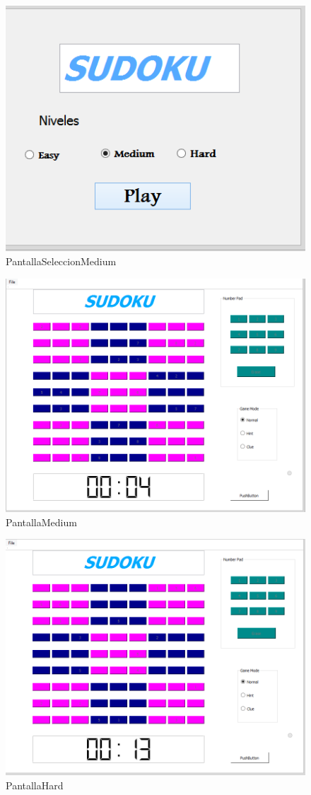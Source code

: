 \documentclass[12pt,oneside]{book}
\begin{document}
\begin{figure}[htbp]
\begin{center}
\includegraphics[width=.60\textwidth]{./imagenes/PantallaSeleccionMedium.png}
\caption{PantallaSeleccionMedium}
\label{PantallaSeleccionMedium}
\end{center}
\end{figure}

\begin{figure}[htbp]
\begin{center}
\includegraphics[width=.60\textwidth]{./imagenes/PantallaMedium.png}
\caption{PantallaMedium}
\label{PantallaMedium}
\end{center}
\end{figure}

\begin{figure}[htbp]
\begin{center}
\includegraphics[width=.60\textwidth]{./imagenes/PantallaHard.png}
\caption{PantallaHard}
\label{PantallaHard}
\end{center}
\end{figure}
\end{document}
